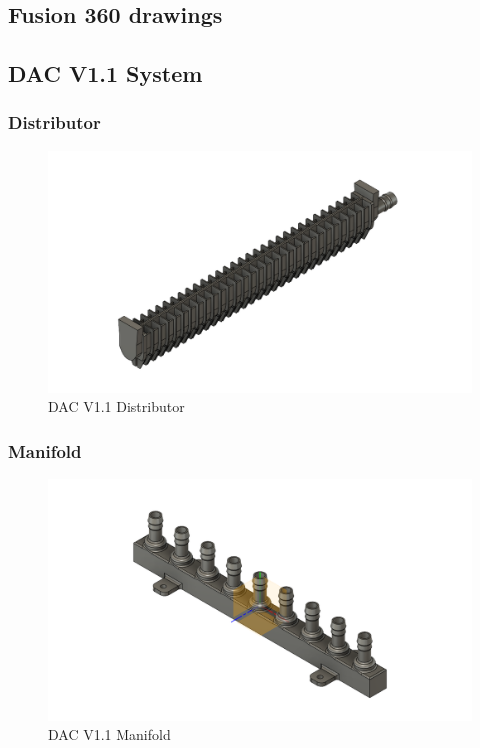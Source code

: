 \begin{appendices}
\newpage
\section{Fusion 360 drawings}
\label{ap:fusion}

\subsection{DAC V1.1 System}

\subsubsection{Distributor}

\begin{figure}[H]
    \centering
    \includegraphics[scale = 0.4]{images/mywork/Sprint4/Distributor_old.png}
    \caption{DAC V1.1 Distributor}
    \label{fig:dacv1.1dis}
\end{figure}


\subsubsection{Manifold}

\begin{figure}[H]
    \centering
    \includegraphics[scale = 0.4]{images/mywork/Sprint4/Manifold_old.png}
    \caption{DAC V1.1 Manifold}
    \label{fig:dacv1.1mani}
\end{figure}



\end{appendices}
